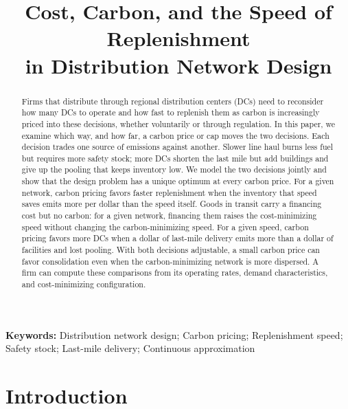 \documentclass[11pt]{article}
\title{Cost, Carbon, and the Speed of Replenishment\\ in Distribution Network Design}
\author{}
\date{}
\numberwithin{proposition}{section}
\theoremstyle{definition}
\theoremstyle{remark}
\theoremstyle{plain}
\begin{document}
\maketitle

\begin{abstract}
\noindent Firms that distribute through regional distribution centers (DCs) need to reconsider how many DCs to operate and
how fast to replenish them as carbon is increasingly priced into these decisions, whether voluntarily or through regulation. In this paper, we examine which way, and how far, a carbon price or cap moves the two
decisions. Each decision
trades one source of emissions against another. Slower line haul burns less fuel but requires more safety stock;
more DCs shorten the last mile but add buildings and give up the
pooling that keeps inventory low. We model the two decisions jointly and show that the design problem has a
unique optimum at every carbon price. For a given network, carbon pricing favors faster replenishment when the
inventory that speed saves emits more per dollar than the speed itself. Goods in transit carry a financing cost
but no carbon: for a given network, financing them raises the cost-minimizing speed without changing the
carbon-minimizing speed. For a given speed, carbon pricing favors more
DCs when a dollar of last-mile delivery emits more than a dollar of facilities and lost pooling.
With both decisions adjustable, a small carbon price can favor consolidation even when the carbon-minimizing
network is more dispersed. A firm can compute these comparisons from its operating rates, demand characteristics,
and cost-minimizing configuration.
\end{abstract}

\vspace{1em}
\noindent\textbf{Keywords:} Distribution network design; Carbon pricing; Replenishment speed; Safety stock; Last-mile delivery; Continuous approximation

\newpage

\section{Introduction}\label{sec:intro}
\end{document}
